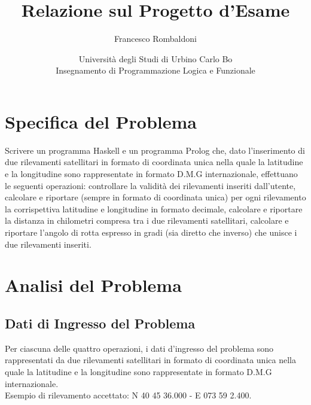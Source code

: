 \documentclass{article}
\title{\textbf{Relazione sul Progetto d'Esame}}
\author{Francesco Rombaldoni}
\date{\small Università degli Studi di Urbino Carlo Bo\\
	Insegnamento di Programmazione Logica e Funzionale}
\begin{document}
	\maketitle
	
	
\newpage

\section{Specifica del Problema}
Scrivere un programma Haskell e un programma Prolog che, dato l'inserimento di due rilevamenti satellitari in formato di coordinata unica nella quale la latitudine e la longitudine sono rappresentate in formato D.M.G internazionale, effettuano le seguenti operazioni: controllare la validità dei rilevamenti inseriti dall'utente, calcolare e riportare (sempre in formato di coordinata unica) per ogni rilevamento la corrispettiva latitudine e longitudine in formato decimale, calcolare e riportare la distanza in chilometri compresa tra i due rilevamenti satellitari, calcolare e riportare l'angolo di rotta espresso in gradi (sia diretto che inverso) che unisce i due rilevamenti inseriti.
\newline
\newline
\newpage
			
\section{Analisi del Problema}
\subsection{Dati di Ingresso del Problema}
Per ciascuna delle quattro operazioni, i dati d'ingresso del problema sono rappresentati da due rilevamenti satellitari in formato di coordinata unica nella quale la latitudine e la longitudine sono rappresentate in formato D.M.G internazionale. \\
Esempio di rilevamento accettato: N 40 45 36.000 - E 073 59 2.400.
\end{document}
